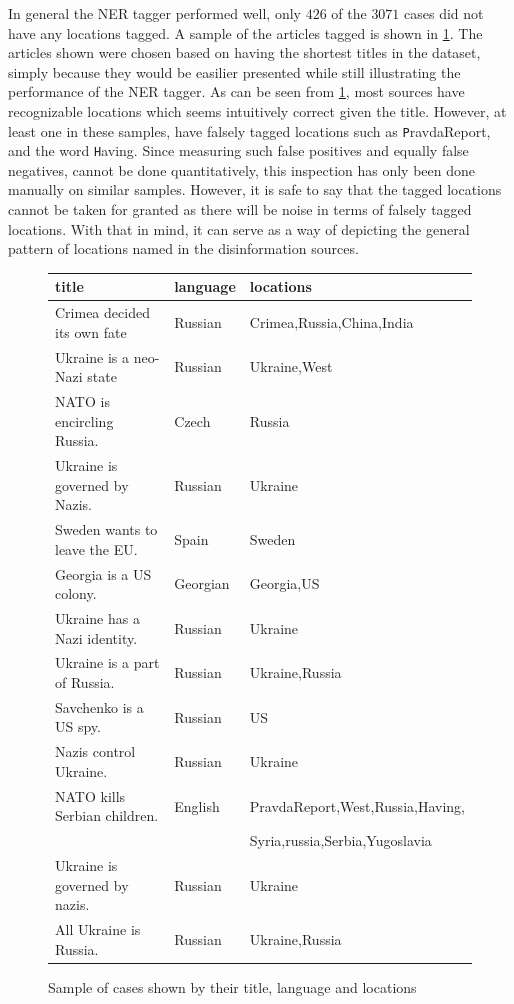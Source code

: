 \documentclass{article}
\begin{document}
In general the NER tagger performed well, only $426$ of the $3071$ cases did not have any locations tagged. A sample of the articles tagged is shown in \cref{fig:article_title_lang_loc}. The articles shown were chosen based on having the shortest titles in the dataset, simply because they would be easilier presented while still illustrating the performance of the NER tagger. As can be seen from \cref{fig:article_title_lang_loc}, most sources have recognizable locations which seems intuitively correct given the title. However, at least one in these samples, have falsely tagged locations such as {\texttt PravdaReport}, and the word {\texttt Having}. Since measuring such false positives and equally false negatives, cannot be done quantitatively, this inspection has only been done manually on similar samples. However, it is safe to say that the tagged locations cannot be taken for granted as there will be noise in terms of falsely tagged locations. With that in mind, it can serve as a way of depicting the general pattern of locations named in the disinformation sources.

\begin{figure}[H]
\caption{Sample of cases shown by their title, language and locations}
\label{fig:article_title_lang_loc}
\begin{tabular}{l | l | l }
        {\bf title } & {\bf language } & {\bf locations }\\ \hline
        Crimea decided its own fate & Russian & Crimea,Russia,China,India \\
        Ukraine is a neo-Nazi state & Russian & Ukraine,West \\
        NATO is encircling Russia. & Czech & Russia \\
        Ukraine is governed by Nazis. & Russian & Ukraine \\
        Sweden wants to leave the EU. & Spain & Sweden \\
        Georgia is a US colony. & Georgian & Georgia,US \\
        Ukraine has a Nazi identity. & Russian & Ukraine \\
        Ukraine is a part of Russia. & Russian & Ukraine,Russia \\
        Savchenko is a US spy. & Russian & US \\
        Nazis control Ukraine. & Russian & Ukraine \\
        NATO kills Serbian children. & English & PravdaReport,West,Russia,Having,\\
                                     &         & Syria,russia,Serbia,Yugoslavia \\
        Ukraine is governed by nazis. & Russian & Ukraine \\
        All Ukraine is Russia. & Russian & Ukraine,Russia \\
    \end{tabular}
\end{figure}
\end{document}
